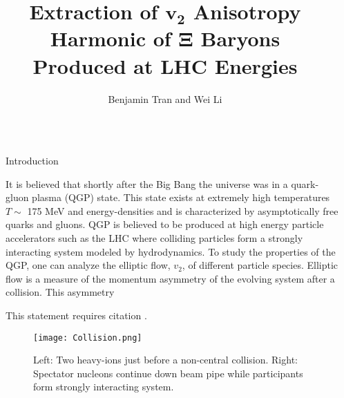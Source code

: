 \documentclass[final]{beamer}
\title{Extraction of $ \boldsymbol{v_{2}} $ Anisotropy Harmonic of $
\boldsymbol{\Xi} $ Baryons\\ Produced at LHC Energies} %
\author{Benjamin Tran and Wei Li} %
\institute{Rice University Bonner Nuclear Laboratories} %
\newlength{\sepwid}
\newlength{\onecolwid}
\begin{document}

\setlength{\belowcaptionskip}{2ex} %
\setlength\belowdisplayshortskip{2ex} %

\begin{frame}[t] %

\begin{columns}[t] %

\begin{column}{\sepwid}\end{column} %

\begin{column}{\onecolwid} %



\begin{block}{Introduction}

It is believed that shortly after the Big Bang the universe was in a quark-gluon
plasma (QGP) state. This state exists at extremely high temperatures $T \sim
$ 175 MeV and energy-densities and is characterized by asymptotically free
quarks and gluons. QGP is believed to be produced at high energy
particle accelerators such as the LHC where colliding particles form a strongly
interacting system modeled by hydrodynamics. To study the properties of the QGP,
one can analyze the elliptic flow, $ v_{2} $, of different particle species.
Elliptic flow is a measure of the momentum asymmetry of the evolving system
after a collision. This asymmetry 

This statement requires citation \cite{Smith:2012qr}.

\end{block}


\begin{figure}
\texttt{[image: Collision.png]}
\caption{Left: Two heavy-ions just before a non-central collision. Right:
Spectator nucleons continue down beam pipe while participants form strongly
interacting system.}
\end{figure}


\end{column}
\end{columns}
\end{frame}
\end{document}
